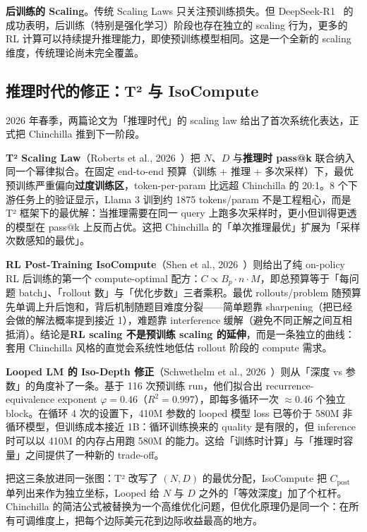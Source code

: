 \textbf{后训练的 Scaling}。传统 Scaling Laws 只关注预训练损失。但 DeepSeek-R1~\cite{deepseekr1} 的成功表明，后训练（特别是强化学习）阶段也存在独立的 scaling 行为，更多的 RL 计算可以持续提升推理能力，即使预训练模型相同。这是一个全新的 scaling 维度，传统理论尚未完全覆盖。

\subsection{推理时代的修正：T² 与 IsoCompute}

2026 年春季，两篇论文为「推理时代」的 scaling law 给出了首次系统化表达，正式把 Chinchilla 推到下一阶段。

\textbf{T² Scaling Law}（Roberts et al., 2026~\cite{roberts2026t2}）把 $N$、$D$ 与\textbf{推理时 pass@k} 联合纳入同一个幂律拟合。在固定 end-to-end 预算（训练 + 推理 + 多次采样）下，最优预训练严重偏向\textbf{过度训练区}，token-per-param 比远超 Chinchilla 的 20:1。8 个下游任务上的验证显示，Llama 3 训到约 1875 tokens/param 不是工程粗心，而是 T² 框架下的最优解：当推理需要在同一 query 上跑多次采样时，更小但训得更透的模型在 pass@k 上反而占优。这把 Chinchilla 的「单次推理最优」扩展为「采样次数感知的最优」。

\textbf{RL Post-Training IsoCompute}（Shen et al., 2026~\cite{shen2026isocompute}）则给出了纯 on-policy RL 后训练的第一个 compute-optimal 配方：$C \propto B_p \cdot n \cdot M$，即总预算等于「每问题 batch」、「rollout 数」与「优化步数」三者乘积。最优 rollouts/problem 随预算先单调上升后饱和，背后机制随题目难度分裂——简单题靠 sharpening（把已经会做的解法概率提到接近 1），难题靠 interference 缓解（避免不同正解之间互相抵消）。结论是\textbf{RL scaling 不是预训练 scaling 的延伸}，而是一条独立的曲线：套用 Chinchilla 风格的直觉会系统性地低估 rollout 阶段的 compute 需求。

\textbf{Looped LM 的 Iso-Depth 修正}（Schwethelm et al., 2026~\cite{schwethelm2026looped}）则从「深度 vs 参数」的角度补了一条。基于 116 次预训练 run，他们拟合出 recurrence-equivalence exponent $\varphi = 0.46$（$R^2 = 0.997$），即每多循环一次 $\approx 0.46$ 个独立 block。在循环 4 次的设置下，410M 参数的 looped 模型 loss 已等价于 580M 非循环模型，但训练成本接近 1B：循环训练换来的 quality 是有限的，但 inference 时可以以 410M 的内存占用跑 580M 的能力。这给「训练时计算」与「推理时容量」之间提供了一种新的 trade-off。

把这三条放进同一张图：T² 改写了 $(N, D)$ 的最优分配，IsoCompute 把 $C_{\text{post}}$ 单列出来作为独立坐标，Looped 给 $N$ 与 $D$ 之外的「等效深度」加了个杠杆。Chinchilla 的简洁公式被替换为一个高维优化问题，但优化原理仍是同一个：在所有可调维度上，把每个边际美元花到边际收益最高的地方。

